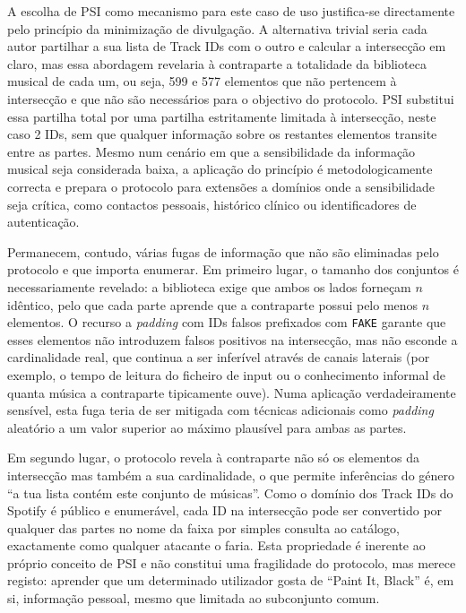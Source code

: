 A escolha de PSI como mecanismo para este caso de uso justifica-se directamente pelo princípio da minimização de divulgação. A alternativa trivial seria cada autor partilhar a sua lista de Track IDs com o outro e calcular a intersecção em claro, mas essa abordagem revelaria à contraparte a totalidade da biblioteca musical de cada um, ou seja, 599 e 577 elementos que não pertencem à intersecção e que não são necessários para o objectivo do protocolo. PSI substitui essa partilha total por uma partilha estritamente limitada à intersecção, neste caso 2 IDs, sem que qualquer informação sobre os restantes elementos transite entre as partes. Mesmo num cenário em que a sensibilidade da informação musical seja considerada baixa, a aplicação do princípio é metodologicamente correcta e prepara o protocolo para extensões a domínios onde a sensibilidade seja crítica, como contactos pessoais, histórico clínico ou identificadores de autenticação.

Permanecem, contudo, várias fugas de informação que não são eliminadas pelo protocolo e que importa enumerar. Em primeiro lugar, o tamanho dos conjuntos é necessariamente revelado: a biblioteca exige que ambos os lados forneçam $n$ idêntico, pelo que cada parte aprende que a contraparte possui pelo menos $n$ elementos. O recurso a \emph{padding} com IDs falsos prefixados com \texttt{FAKE} garante que esses elementos não introduzem falsos positivos na intersecção, mas não esconde a cardinalidade real, que continua a ser inferível através de canais laterais (por exemplo, o tempo de leitura do ficheiro de input ou o conhecimento informal de quanta música a contraparte tipicamente ouve). Numa aplicação verdadeiramente sensível, esta fuga teria de ser mitigada com técnicas adicionais como \emph{padding} aleatório a um valor superior ao máximo plausível para ambas as partes.

Em segundo lugar, o protocolo revela à contraparte não só os elementos da intersecção mas também a sua cardinalidade, o que permite inferências do género ``a tua lista contém este conjunto de músicas''. Como o domínio dos Track IDs do Spotify é público e enumerável, cada ID na intersecção pode ser convertido por qualquer das partes no nome da faixa por simples consulta ao catálogo, exactamente como qualquer atacante o faria. Esta propriedade é inerente ao próprio conceito de PSI e não constitui uma fragilidade do protocolo, mas merece registo: aprender que um determinado utilizador gosta de ``Paint It, Black'' é, em si, informação pessoal, mesmo que limitada ao subconjunto comum.


